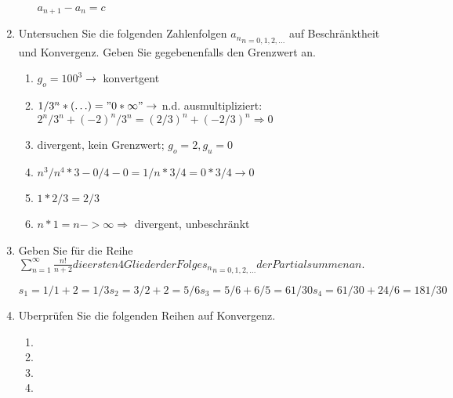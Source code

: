 \documentclass[12pt,a4paper]{scrreprt}
\begin{document}
\begin{enumerate}
\begin{enumerate}
$a_{n+1}-a_{n} =c $

\end{enumerate}

\item Untersuchen Sie die folgenden Zahlenfolgen ${a_n}_{n=0,1,2,...}$ auf Beschränktheit
und Konvergenz. Geben Sie gegebenenfalls den Grenzwert an.

\begin{enumerate}

\item $g_o = 100^3 \rightarrow$ konvertgent
\item $1/3^n * ( \ldots ) = "0 * \infty" \rightarrow$ n.d.
ausmultipliziert: $ 2^n / 3^n + (-2)^n / 3^n = (2/3)^n + (-2 / 3)^n \Rightarrow 0 $
\item divergent, kein Grenzwert; $g_o=2, g_u=0$
\item $n^3/n^4 * 3-0/4-0 = 1/n * 3/4 = 0 * 3/4 \rightarrow 0$
\item $1 * 2/3 = 2/3$
\item $n * 1 = n -> \infty \Rightarrow $ divergent, unbeschränkt

\end{enumerate}

\item Geben Sie für die Reihe
$\sum_{n=1}^{\infty} \frac{n!}{n+2} 
die ersten 4 Glieder der Folge {s_n}_{n=0,1,2,\ldots} der
Partialsummen an.$

\[
s_1 = 1/1+2 = 1/3
s_2 = 3/2+2 = 5/6
s_3 = 5/6 + 6/5 = 61/30
s_4 = 61/30 + 24/6 = 181/30
\]

\item Uberprüfen Sie die folgenden Reihen auf Konvergenz.

\begin{enumerate}

\item 
\item 
\item 
\item 

\end{enumerate}

\end{enumerate}
\end{document}
